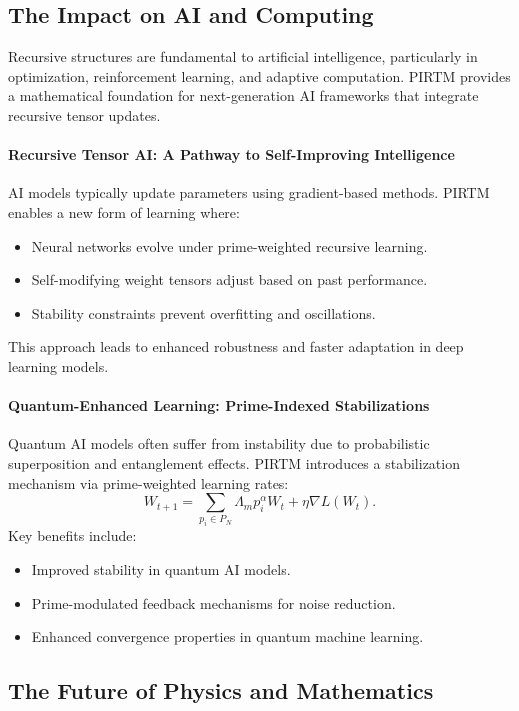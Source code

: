 \documentclass{article}
\theoremstyle{plain}
\begin{document}
\subsection{The Impact on AI and Computing}

Recursive structures are fundamental to artificial intelligence, particularly in optimization, reinforcement learning, and adaptive computation. PIRTM provides a mathematical foundation for next-generation AI frameworks that integrate recursive tensor updates.

\paragraph{Recursive Tensor AI: A Pathway to Self-Improving Intelligence}
AI models typically update parameters using gradient-based methods. PIRTM enables a new form of learning where:
\begin{itemize}
    \item Neural networks evolve under prime-weighted recursive learning.
    \item Self-modifying weight tensors adjust based on past performance.
    \item Stability constraints prevent overfitting and oscillations.
\end{itemize}
This approach leads to enhanced robustness and faster adaptation in deep learning models.

\paragraph{Quantum-Enhanced Learning: Prime-Indexed Stabilizations}
Quantum AI models often suffer from instability due to probabilistic superposition and entanglement effects. PIRTM introduces a stabilization mechanism via prime-weighted learning rates:
\begin{equation}
    W_{t+1} = \sum_{p_i \in P_N} \Lambda_m p_i^\alpha W_t + \eta \nabla L(W_t).
\end{equation}
Key benefits include:
\begin{itemize}
    \item Improved stability in quantum AI models.
    \item Prime-modulated feedback mechanisms for noise reduction.
    \item Enhanced convergence properties in quantum machine learning.
\end{itemize}

\subsection{The Future of Physics and Mathematics}
\end{document}
